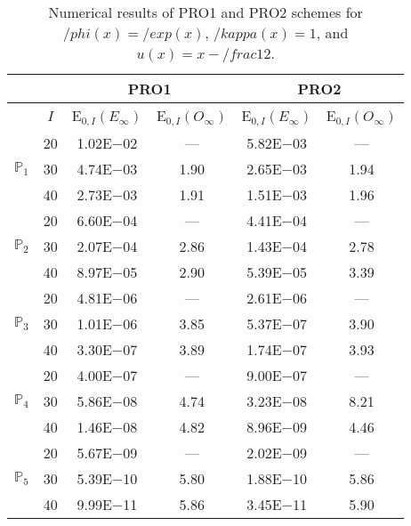 \begin{table}[H]
\caption{Numerical results of PRO1 and PRO2 schemes for $/phi(x)=/exp(x)$, $/kappa(x)=1$, and $u(x)=x-/frac{1}{2}$.}
\setlength{\tabcolsep}{5pt}
\centering
\begin{tabular}{@{}l c c c c c@{}}
\toprule
 &  & \multicolumn{2}{c}{PRO1} & \multicolumn{2}{c}{PRO2}\\
\midrule
 & $I$ & E$_{0,I}(E_{\infty})$ & E$_{0,I}(O_{\infty})$ & E$_{0,I}(E_{\infty})$ & E$_{0,I}(O_{\infty})$\\
\midrule
\multirow{3}{*}{$\mathbb{P}_{1}$}
 & 20 & 1.02E$-$02 & --- & 5.82E$-$03 & ---\\
 & 30 & 4.74E$-$03 & 1.90 & 2.65E$-$03 & 1.94 \\
 & 40 & 2.73E$-$03 & 1.91 & 1.51E$-$03 & 1.96 \\
\midrule
\multirow{3}{*}{$\mathbb{P}_{2}$}
 & 20 & 6.60E$-$04 & --- & 4.41E$-$04 & ---\\
 & 30 & 2.07E$-$04 & 2.86 & 1.43E$-$04 & 2.78 \\
 & 40 & 8.97E$-$05 & 2.90 & 5.39E$-$05 & 3.39 \\
\midrule
\multirow{3}{*}{$\mathbb{P}_{3}$}
 & 20 & 4.81E$-$06 & --- & 2.61E$-$06 & ---\\
 & 30 & 1.01E$-$06 & 3.85 & 5.37E$-$07 & 3.90 \\
 & 40 & 3.30E$-$07 & 3.89 & 1.74E$-$07 & 3.93 \\
\midrule
\multirow{3}{*}{$\mathbb{P}_{4}$}
 & 20 & 4.00E$-$07 & --- & 9.00E$-$07 & ---\\
 & 30 & 5.86E$-$08 & 4.74 & 3.23E$-$08 & 8.21 \\
 & 40 & 1.46E$-$08 & 4.82 & 8.96E$-$09 & 4.46 \\
\midrule
\multirow{3}{*}{$\mathbb{P}_{5}$}
 & 20 & 5.67E$-$09 & --- & 2.02E$-$09 & ---\\
 & 30 & 5.39E$-$10 & 5.80 & 1.88E$-$10 & 5.86 \\
 & 40 & 9.99E$-$11 & 5.86 & 3.45E$-$11 & 5.90 \\
\bottomrule
\end{tabular}
\label{Table:PRO:Test4}
\end{table}
